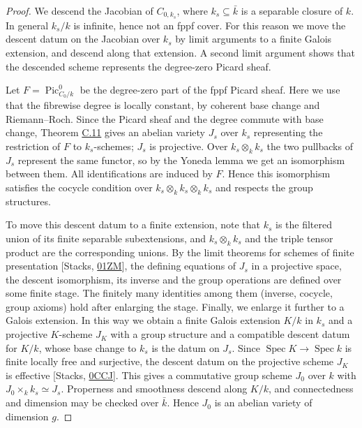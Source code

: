\documentclass[11pt]{article}
\begin{document}
\begin{proof}[{Proof}]\label{bp50}%
We descend the Jacobian of \(C_{0,k_s}\), where \(k_s\subseteq\bar
k\) is a separable closure of \(k\). In general \(k_s/k\) is infinite, hence not an fppf cover. For this reason we move the descent datum on the Jacobian over \(k_s\) by limit arguments to a finite Galois extension, and descend along that extension. A second limit argument shows that the descended scheme represents the degree-zero Picard sheaf.

Let \(F=\operatorname{Pic}^0_{C_0/k}\) be the degree-zero part of the fppf Picard sheaf. Here we use that the fibrewise degree is locally constant, by coherent base change and Riemann–Roch. Since the Picard sheaf and the degree commute with base change, Theorem \hyperref[bp36]{C.11} gives an abelian variety \(J_s\) over \(k_s\) representing the restriction of \(F\) to \(k_s\)-schemes; \(J_s\) is projective. Over \(k_s\otimes_kk_s\) the two pullbacks of \(J_s\) represent the same functor, so by the Yoneda lemma we get an isomorphism between them. All identifications are induced by \(F\). Hence this isomorphism satisfies the cocycle condition over \(k_s\otimes_kk_s\otimes_kk_s\) and respects the group structures.

To move this descent datum to a finite extension, note that \(k_s\) is the filtered union of its finite separable subextensions, and \(k_s\otimes_kk_s\) and the triple tensor product are the corresponding unions. By the limit theorems for schemes of finite presentation [Stacks, \href{https://stacks.math.columbia.edu/tag/01ZM}{01ZM}], the defining equations of \(J_s\) in a projective space, the descent isomorphism, its inverse and the group operations are defined over some finite stage. The finitely many identities among them (inverse, cocycle, group axioms) hold after enlarging the stage. Finally, we enlarge it further to a Galois extension. In this way we obtain a finite Galois extension \(K/k\) in \(k_s\) and a projective \(K\)-scheme \(J_K\) with a group structure and a compatible descent datum for \(K/k\), whose base change to \(k_s\) is the datum on \(J_s\). Since \(\operatorname{Spec}K\to\operatorname{Spec}k\) is finite locally free and surjective, the descent datum on the projective scheme \(J_K\) is effective [Stacks, \href{https://stacks.math.columbia.edu/tag/0CCJ}{0CCJ}]. This gives a commutative group scheme \(J_0\) over \(k\) with \(J_0\times_kk_s\simeq J_s\). Properness and smoothness descend along \(K/k\), and connectedness and dimension may be checked over \(\bar
k\). Hence \(J_0\) is an abelian variety of dimension \(g\).


\end{proof}
\end{document}
